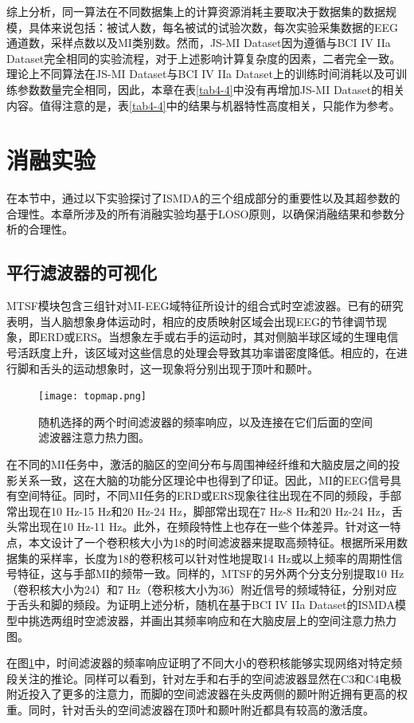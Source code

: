 综上分析，同一算法在不同数据集上的计算资源消耗主要取决于数据集的数据规模，具体来说包括：被试人数，每名被试的试验次数，每次实验采集数据的EEG通道数，采样点数以及MI类别数。然而，JS-MI Dataset因为遵循与BCI IV IIa Dataset完全相同的实验流程，对于上述影响计算复杂度的因素，二者完全一致。理论上不同算法在JS-MI Dataset与BCI IV IIa Dataset上的训练时间消耗以及可训练参数数量完全相同，因此，本章在表\ref{tab4-4}中没有再增加JS-MI Dataset的相关内容。值得注意的是，表\ref{tab4-4}中的结果与机器特性高度相关，只能作为参考。


\section{消融实验}
在本节中，通过以下实验探讨了ISMDA的三个组成部分的重要性以及其超参数的合理性。本章所涉及的所有消融实验均基于LOSO原则，以确保消融结果和参数分析的合理性。
\subsection{平行滤波器的可视化}
MTSF模块包含三组针对MI-EEG域特征所设计的组合式时空滤波器。已有的研究表明\cite{4-22}，当人脑想象身体运动时，相应的皮质映射区域会出现EEG的节律调节现象，即ERD或ERS\cite{4-23}。当想象左手或右手的运动时，其对侧脑半球区域的生理电信号活跃度上升，该区域对这些信息的处理会导致其功率谱密度降低。相应的，在进行脚和舌头的运动想象时，这一现象将分别出现于顶叶和颞叶。

\begin{figure}[!h]
\centering
\texttt{[image: topmap.png]}
\caption{随机选择的两个时间滤波器的频率响应，以及连接在它们后面的空间滤波器注意力热力图。}
\label{fig_4_4}
\end{figure}

在不同的MI任务中，激活的脑区的空间分布与周围神经纤维和大脑皮层之间的投影关系一致，这在大脑的功能分区理论中也得到了印证。因此，MI的EEG信号具有空间特征。同时，不同MI任务的ERD或ERS现象往往出现在不同的频段，手部常出现在10 Hz-15 Hz和20 Hz-24 Hz，脚部常出现在7 Hz-8 Hz和20 Hz-24 Hz，舌头常出现在10 Hz-11 Hz。此外，在频段特性上也存在一些个体差异\cite{4-24}。针对这一特点，本文设计了一个卷积核大小为18的时间滤波器来提取高频特征。根据所采用数据集的采样率，长度为18的卷积核可以针对性地提取14 Hz或以上频率的周期性信号特征，这与手部MI的频带一致。同样的，MTSF的另外两个分支分别提取10 Hz（卷积核大小为24）和7 Hz（卷积核大小为36）附近信号的频域特征，分别对应于舌头和脚的频段。为证明上述分析，随机在基于BCI IV IIa Dataset的ISMDA模型中挑选两组时空滤波器，并画出其频率响应和在大脑皮层上的空间注意力热力图。

在图\ref{fig_4_4}中，时间滤波器的频率响应证明了不同大小的卷积核能够实现网络对特定频段关注的推论。同样可以看到，针对左手和右手的空间滤波器显然在C3和C4电极附近投入了更多的注意力，而脚的空间滤波器在头皮两侧的颞叶附近拥有更高的权重。同时，针对舌头的空间滤波器在顶叶和颞叶附近都具有较高的激活度。

